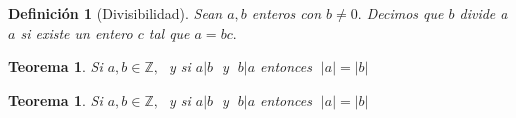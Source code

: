 \documentclass{book}
\newcommand{\Z}{\mathbb{Z}} %
\theoremstyle{estiloB}
\newtheorem{unadefiB}{Definición}[chapter]
\newtheorem{unteoB}{Teorema}[section]
\theoremstyle{estiloC}
\newtheorem{unteoC}{Teorema}
\begin{document}
\begin{unadefiB}[Divisibilidad]\label{divisibilidad}
Sean $a,b$ enteros con $b \not = 0.$ Decimos que $b$ divide a $a$
si existe un entero $c$ tal que $a=bc.$
\end{unadefiB}
\begin{unteoB}
Si $a,b \in \Z,\;$ y si $a|b\;$ y $\;b|a$ entonces $\;|a|=|b|$
\end{unteoB}
\begin{unteoC}
Si $a,b \in \Z,\;$ y si $a|b\;$ y $\;b|a$ entonces $\;|a|=|b|$
\end{unteoC}
\end{document}
